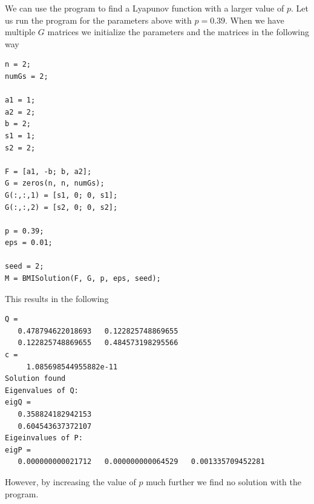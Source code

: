 \documentclass[a4paper,12pt,twoside,BCOR=10mm]{scrbook}
\begin{document}
We can use the program to find a Lyapunov function with a larger value of $p$. Let us run the program for the parameters above with $p = 0.39$. When we have multiple $G$ matrices we initialize the parameters and the matrices in the following way
\begin{lstlisting}
n = 2;
numGs = 2;

a1 = 1;
a2 = 2;
b = 2;
s1 = 1;
s2 = 2;

F = [a1, -b; b, a2];
G = zeros(n, n, numGs);
G(:,:,1) = [s1, 0; 0, s1];
G(:,:,2) = [s2, 0; 0, s2];

p = 0.39;
eps = 0.01;

seed = 2;
M = BMISolution(F, G, p, eps, seed); 
\end{lstlisting}

This results in the following
\begin{lstlisting}
Q =
   0.478794622018693   0.122825748869655
   0.122825748869655   0.484573198295566
c =
     1.085698544955882e-11
Solution found
Eigenvalues of Q:
eigQ =
   0.358824182942153
   0.604543637372107
Eigeinvalues of P:
eigP =
   0.000000000021712   0.000000000064529   0.001335709452281
\end{lstlisting}
However, by increasing the value of $p$ much further we find no solution with the program.
\end{document}
